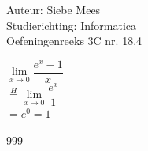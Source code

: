 \documentclass[a4paper]{article}
\begin{document}
  
\noindent \large Auteur: Siebe Mees \\
\noindent \large Studierichting: Informatica\\
\noindent \large Oefeningenreeks 3C nr. 18.4\\

\medskip

\normalsize

$\lim\limits_{x \rightarrow 0} \dfrac{e^x-1}{x}$\\

$\overset{H}{=}  \lim\limits_{x \rightarrow 0} \dfrac{e^x}{1} $\\

$ = e^0 = 1 $\\

\begin{thebibliography}{999}
\end{thebibliography}
\end{document}
